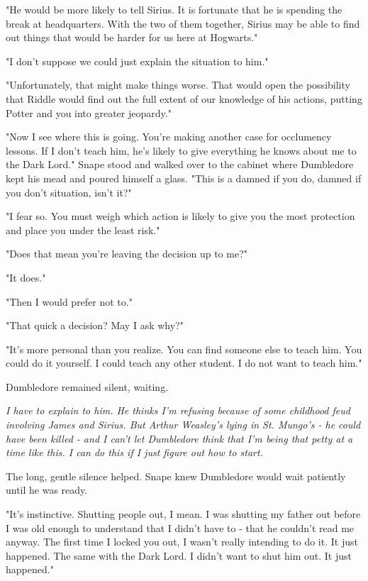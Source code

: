 "He would be more likely to tell Sirius. It is fortunate that he is spending the break at headquarters. With the two of them together, Sirius may be able to find out things that would be harder for us here at Hogwarts."

"I don't suppose we could just explain the situation to him."

"Unfortunately, that might make things worse. That would open the possibility that Riddle would find out the full extent of our knowledge of his actions, putting Potter and you into greater jeopardy."

"Now I see where this is going. You're making another case for occlumency lessons. If I don't teach him, he's likely to give everything he knows about me to the Dark Lord." Snape stood and walked over to the cabinet where Dumbledore kept his mead and poured himself a glass. "This is a damned if you do, damned if you don't situation, isn't it?"

"I fear so. You must weigh which action is likely to give you the most protection and place you under the least risk."

"Does that mean you're leaving the decision up to me?"

"It does."

"Then I would prefer not to."

"That quick a decision? May I ask why?"

"It's more personal than you realize. You can find someone else to teach him. You could do it yourself. I could teach any other student. I do not want to teach him."

Dumbledore remained silent, waiting.

\emph{I have to explain to him. He thinks I'm refusing because of some childhood feud involving James and Sirius. But Arthur Weasley's lying in St. Mungo's - he could have been killed - and I can't let Dumbledore think that I'm being that petty at a time like this. I can do this if I just figure out how to start.}

The long, gentle silence helped. Snape knew Dumbledore would wait patiently until he was ready.

"It's instinctive. Shutting people out, I mean. I was shutting my father out before I was old enough to understand that I didn't have to - that he couldn't read me anyway. The first time I locked you out, I wasn't really intending to do it. It just happened. The same with the Dark Lord. I didn't want to shut him out. It just happened."

